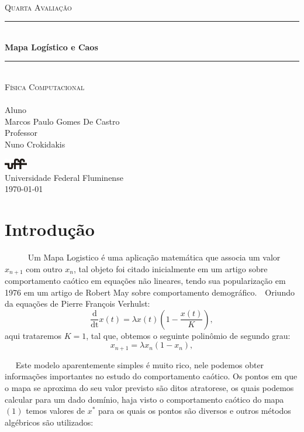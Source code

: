 \documentclass[pdftex,12pt,a4paper]{article}
\newcommand{\HRule}{\rule{\linewidth}{0.3mm}}
\begin{document}
\begin{titlepage}
\begin{center}

~\\[5.0cm]
\textsc{\large Quarta Avaliação}\\
\HRule \\[0.4cm]
{ \huge \bfseries Mapa Logístico e Caos \\[0.4cm] }
\HRule \\[0.5cm]
\textsc{\Large Física Computacional}\\
~\\[3.5cm]
\noindent
\small Aluno\\
\large \textsc Marcos Paulo Gomes De Castro\\[0.2cm]
\small Professor\\
\large \textsc Nuno Crokidakis\\[0.2 cm]
\vfill

\includegraphics[width=1.0cm]{logo}\\

\textsc Universidade Federal Fluminense\\ 
{\normalsize \today}

\end{center}
\end{titlepage}

\section*{Introdução}
 ~~~~~ Um Mapa Logistico é uma aplicação matemática que associa um valor $x_{n+1}$ com outro $x_{n}$, tal objeto foi citado inicialmente em um artigo sobre comportamento caótico em equações não lineares, tendo sua popularização em 1976 em um artigo de  Robert May sobre comportamento demográfico.\
~Oriundo da equações de Pierre François Verhulst:
\begin{equation}
\mathrm{\frac{d}{dt}}x(t) = \lambda x(t)\left(1 - \frac{x(t)}{K}\right),\label{eq:diferencial}
\end{equation}
aqui trataremos $K = 1$, tal que, obtemos o seguinte polinômio de segundo grau:
\begin{equation}
x_{n+1} = \lambda x_n(1-x_n),\label{eq:map}
\end{equation}

~~ Este modelo aparentemente simples é muito rico, nele podemos obter informações importantes  no estudo do comportamento caótico. Os pontos em que o mapa se aproxima do seu valor previsto são ditos atratorese, os quais podemos calcular para um dado domínio, haja visto o comportamento caótico do mapa $(1)$ temos valores de $x^*$ para os quais os pontos são diversos e outros métodos algébricos são utilizados:
\end{document}
